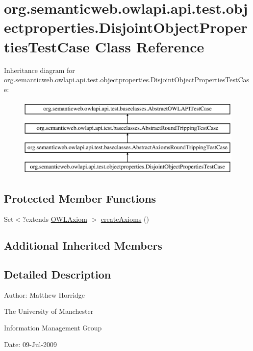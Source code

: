 \hypertarget{classorg_1_1semanticweb_1_1owlapi_1_1api_1_1test_1_1objectproperties_1_1_disjoint_object_properties_test_case}{\section{org.\-semanticweb.\-owlapi.\-api.\-test.\-objectproperties.\-Disjoint\-Object\-Properties\-Test\-Case Class Reference}
\label{classorg_1_1semanticweb_1_1owlapi_1_1api_1_1test_1_1objectproperties_1_1_disjoint_object_properties_test_case}
}
Inheritance diagram for org.\-semanticweb.\-owlapi.\-api.\-test.\-objectproperties.\-Disjoint\-Object\-Properties\-Test\-Case\-:\begin{figure}[H]
\begin{center}
\leavevmode
\includegraphics[height=4.000000cm]{classorg_1_1semanticweb_1_1owlapi_1_1api_1_1test_1_1objectproperties_1_1_disjoint_object_properties_test_case}
\end{center}
\end{figure}
\subsection*{Protected Member Functions}
\begin{DoxyCompactItemize}
\item 
Set$<$?extends \hyperlink{interfaceorg_1_1semanticweb_1_1owlapi_1_1model_1_1_o_w_l_axiom}{O\-W\-L\-Axiom} $>$ \hyperlink{classorg_1_1semanticweb_1_1owlapi_1_1api_1_1test_1_1objectproperties_1_1_disjoint_object_properties_test_case_aaf8e503ffd42f49803f3fd8c03cf254e}{create\-Axioms} ()
\end{DoxyCompactItemize}
\subsection*{Additional Inherited Members}


\subsection{Detailed Description}
Author\-: Matthew Horridge\par
 The University of Manchester\par
 Information Management Group\par
 Date\-: 09-\/\-Jul-\/2009 

